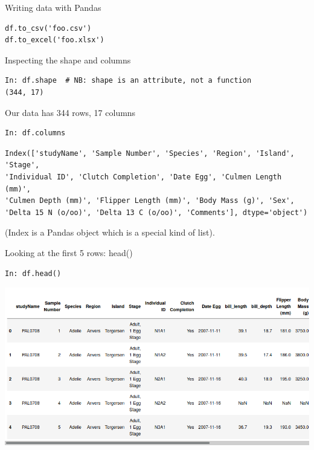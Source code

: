 \documentclass[aspectratio=169,usenames,dvipsnames]{beamer}
\begin{document}
\begin{frame}[fragile]{Writing data with Pandas}
\begin{lstlisting}
df.to_csv('foo.csv')
df.to_excel('foo.xlsx')
\end{lstlisting}
\end{frame}



\begin{frame}[fragile]{Inspecting the shape and columns}
\begin{lstlisting}
In: df.shape  # NB: shape is an attribute, not a function
(344, 17)
\end{lstlisting}

Our data has 344 rows, 17 columns

\begin{lstlisting}
In: df.columns
\end{lstlisting}
\vspace{-1em}
\begin{lstlisting}[style=plain]
Index(['studyName', 'Sample Number', 'Species', 'Region', 'Island', 'Stage',
'Individual ID', 'Clutch Completion', 'Date Egg', 'Culmen Length (mm)',
'Culmen Depth (mm)', 'Flipper Length (mm)', 'Body Mass (g)', 'Sex',
'Delta 15 N (o/oo)', 'Delta 13 C (o/oo)', 'Comments'], dtype='object')
\end{lstlisting}
(Index is a Pandas object which is a special kind of list).
\end{frame}

\begin{frame}[fragile]{Looking at the first 5 rows: head()}
\vspace{-0.5em}
\begin{lstlisting}
In: df.head()
\end{lstlisting}

\vspace{-1em}
\includegraphics[height=0.8\textheight]{fig/penguinshead}
\end{frame}
\end{document}
